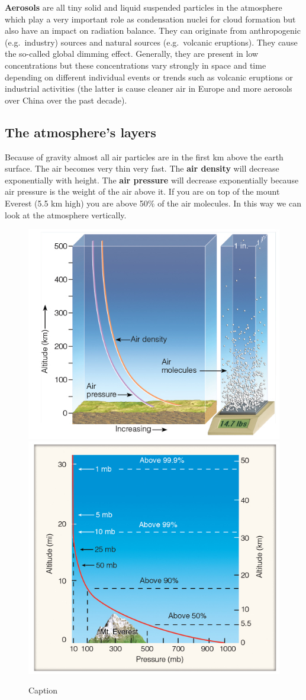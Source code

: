 \documentclass[oneside]{book}
\begin{document}
\textbf{Aerosols} are all tiny solid and liquid suspended particles in
the atmosphere which play a very important role as condensation nuclei
for cloud formation but also have an impact on radiation balance. They
can originate from anthropogenic (e.g.~industry) sources and natural
sources (e.g.~volcanic eruptions). They cause the so-called global
dimming effect. Generally, they are present in low concentrations but
these concentrations vary strongly in space and time depending on
different individual events or trends such as volcanic eruptions or
industrial activities (the latter is cause cleaner air in Europe and
more aerosols over China over the past decade).

\subsection{The atmosphere's layers}\label{the-atmospheres-layers}

Because of gravity almost all air particles are in the first km above
the earth surface. The air becomes very thin very fast. The \textbf{air
density} will decrease exponentially with height. The \textbf{air
pressure} will decrease exponentially because air pressure is the weight
of the air above it. If you are on top of the mount Everest (5.5 km
high) you are above 50\% of the air molecules. In this way we can look
at the atmosphere vertically.

\begin{figure}

{\centering \includegraphics[width=0.4\linewidth]{figures/Figure12a} \includegraphics[width=0.4\linewidth]{figures/Figure12b} 

}

\caption{Caption}\label{fig:Layers}
\end{figure}
\end{document}
